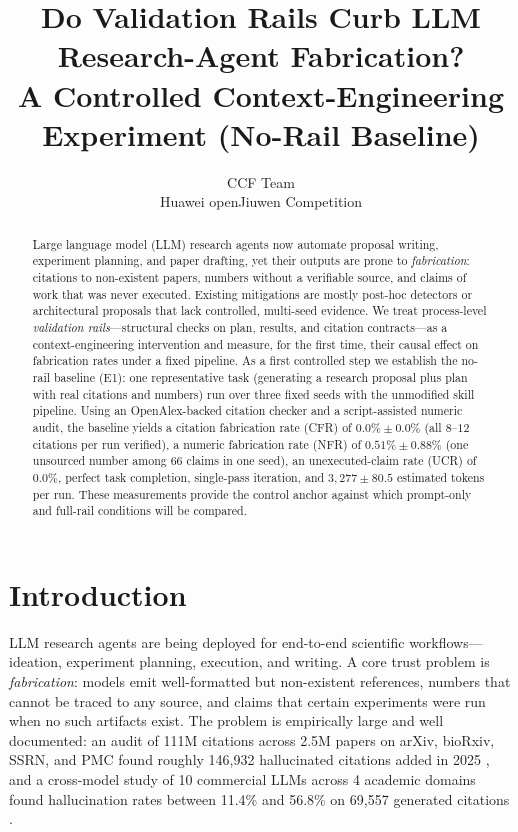 \documentclass[10pt,twocolumn]{article}
\title{Do Validation Rails Curb LLM Research-Agent Fabrication?\\ A Controlled Context-Engineering Experiment (No-Rail Baseline)}
\author{CCF Team\\ Huawei openJiuwen Competition}
\date{}
\begin{document}
\maketitle

\begin{abstract}
Large language model (LLM) research agents now automate proposal writing, experiment planning, and paper drafting, yet their outputs are prone to \emph{fabrication}: citations to non-existent papers, numbers without a verifiable source, and claims of work that was never executed. Existing mitigations are mostly post-hoc detectors or architectural proposals that lack controlled, multi-seed evidence. We treat process-level \emph{validation rails}---structural checks on plan, results, and citation contracts---as a context-engineering intervention and measure, for the first time, their causal effect on fabrication rates under a fixed pipeline. As a first controlled step we establish the no-rail baseline (E1): one representative task (generating a research proposal plus plan with real citations and numbers) run over three fixed seeds with the unmodified skill pipeline. Using an OpenAlex-backed citation checker and a script-assisted numeric audit, the baseline yields a citation fabrication rate (CFR) of $0.0\% \pm 0.0\%$ (all $8$--$12$ citations per run verified), a numeric fabrication rate (NFR) of $0.51\% \pm 0.88\%$ (one unsourced number among $66$ claims in one seed), an unexecuted-claim rate (UCR) of $0.0\%$, perfect task completion, single-pass iteration, and $3{,}277 \pm 80.5$ estimated tokens per run. These measurements provide the control anchor against which prompt-only and full-rail conditions will be compared.
\end{abstract}

\section{Introduction}
\label{sec:intro}

LLM research agents are being deployed for end-to-end scientific workflows---ideation, experiment planning, execution, and writing. A core trust problem is \emph{fabrication}: models emit well-formatted but non-existent references, numbers that cannot be traced to any source, and claims that certain experiments were run when no such artifacts exist. The problem is empirically large and well documented: an audit of 111M citations across 2.5M papers on arXiv, bioRxiv, SSRN, and PMC found roughly 146{,}932 hallucinated citations added in 2025 \citep{zhao2026wildhallucinations}, and a cross-model study of 10 commercial LLMs across 4 academic domains found hallucination rates between 11.4\% and 56.8\% on 69{,}557 generated citations \citep{naser2026howllmscite}.
\end{document}

